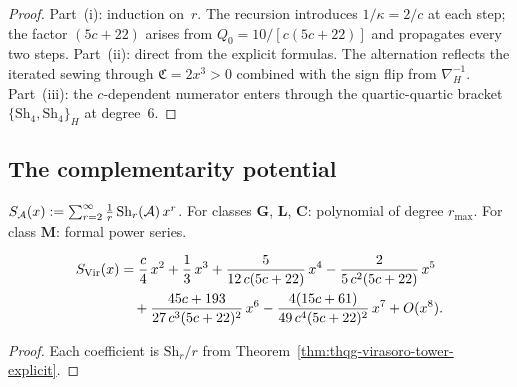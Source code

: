\begin{proof}
Part~(i): induction on~$r$. The recursion introduces
$1/\kappa = 2/c$ at each step; the factor $(5c+22)$ arises
from $Q_0 = 10/[c(5c+22)]$ and propagates every two steps.
Part~(ii): direct from the explicit formulas. The alternation
reflects the iterated sewing through $\mathfrak{C} = 2x^3 > 0$
combined with the sign flip from $\nabla_H^{-1}$.
Part~(iii): the $c$-dependent numerator enters through the
quartic-quartic bracket $\{\mathrm{Sh}_4,\mathrm{Sh}_4\}_H$
at degree~$6$.
\end{proof}



\subsection{The complementarity potential}
\label{subsec:thqg-comp-potential}

\begin{definition}
\label{def:thqg-comp-potential}
$S_{\mathcal{A}}(x) := \sum_{r=2}^{\infty} \frac{1}{r}\,
\mathrm{Sh}_r(\mathcal{A})\,x^r$.
For classes $\mathbf{G}$, $\mathbf{L}$, $\mathbf{C}$:
polynomial of degree $r_{\max}$.
For class $\mathbf{M}$: formal power series.
\end{definition}

\begin{theorem}
\label{thm:thqg-virasoro-potential}
\ClaimStatusProvedHere
\begin{align}\label{eq:thqg-virasoro-potential-explicit}
S_{\mathrm{Vir}}(x)
&= \frac{c}{4}\,x^2
+ \frac{1}{3}\,x^3
+ \frac{5}{12\,c(5c+22)}\,x^4
- \frac{2}{5\,c^2(5c+22)}\,x^5
\notag\\
&\quad + \frac{45c+193}{27\,c^3(5c+22)^2}\,x^6
- \frac{4(15c+61)}{49\,c^4(5c+22)^2}\,x^7
+ O(x^8).
\end{align}
\end{theorem}

\begin{proof}
Each coefficient is $\mathrm{Sh}_r/r$ from
Theorem~\ref{thm:thqg-virasoro-tower-explicit}.
\end{proof}

